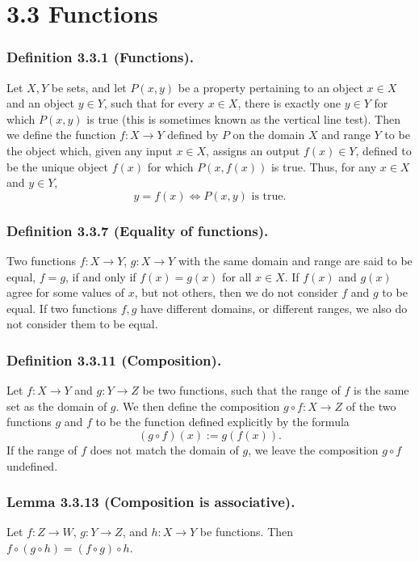 \documentclass[12pt, letter]{article}
\begin{document}
\section*{3.3 Functions}
\subsubsection*{Definition 3.3.1 (Functions).}
Let $X,Y$ be sets, and let $P(x,y)$ be a property pertaining to an object $x\in X$ and an object $y\in Y$, such that
for every $x\in X$, there is exactly one $y\in Y$ for which $P(x,y)$ is true (this is sometimes known as the vertical line test).
Then we define the function $f: X\rightarrow Y$ defined by $P$ on the domain $X$ and range $Y$ to be the object which, 
given any input $x\in X$, assigns an output $f(x)\in Y$, defined to be the unique object $f(x)$ for which $P(x,f(x))$ is true. 
Thus, for any $x\in X$ and $y\in Y$,
\begin{equation*}
    y=f(x)\iff P(x,y) \text{ is true.}
\end{equation*}

\subsubsection*{Definition 3.3.7 (Equality of functions).}
Two functions $f:X\rightarrow Y$, $g:X\rightarrow Y$ with the same domain and range are said to be equal, $f=g$,
if and only if $f(x)=g(x)$ for all $x\in X$. If $f(x)$ and $g(x)$ agree for some values of $x$, but not others, then we do not consider $f$ and 
$g$ to be equal. If two functions $f,g$ have different domains, or different ranges, we also do not consider them to be equal.

\subsubsection*{Definition 3.3.11 (Composition).}
Let $f:X\to Y$ and $g:Y\to Z$ be two functions, such that the range of $f$ is the same set as the domain of $g$. We then define the composition
$g\circ f:X\to Z$ of the two functions $g$ and $f$ to be the function defined explicitly by the formula
\begin{equation*}
    (g\circ f)(x):=g(f(x)).
\end{equation*}
If the range of $f$ does not match the domain of $g$, we leave the composition $g\circ f$ undefined.
\subsubsection*{Lemma 3.3.13 (Composition is associative).}
Let $f:Z\to W$, $g:Y\to Z$, and $h:X\to Y$ be functions. Then $f\circ(g\circ h)=(f\circ g)\circ h$.
\end{document}
